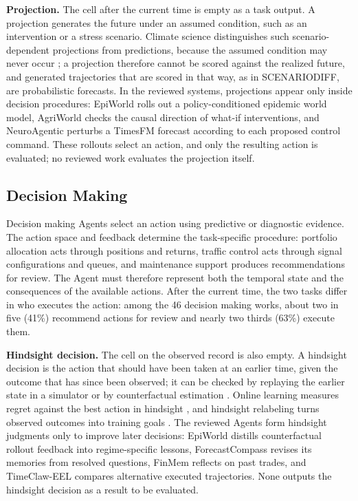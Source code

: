 \documentclass[preprints,article,submit,moreauthors]{Definitions/mdpi}
\begin{document}
\noindent\textbf{Projection.} The cell after the current time is empty as a task output. A projection generates the future under an assumed condition, such as an intervention or a stress scenario. Climate science distinguishes such scenario-dependent projections from predictions, because the assumed condition may never occur \citep{ipcc2021glossary}; a projection therefore cannot be scored against the realized future, and generated trajectories that are scored in that way, as in SCENARIODIFF, are probabilistic forecasts. In the reviewed systems, projections appear only inside decision procedures: EpiWorld \citep{epiworld2026} rolls out a policy-conditioned epidemic world model, AgriWorld \citep{agriworld2026} checks the causal direction of what-if interventions, and NeuroAgentic \citep{neuroagentic2026} perturbs a TimesFM forecast according to each proposed control command. These rollouts select an action, and only the resulting action is evaluated; no reviewed work evaluates the projection itself.

\subsection{Decision Making}
\label{sec:task-decision}

Decision making Agents select an action using predictive or diagnostic evidence. The action space and feedback determine the task-specific procedure: portfolio allocation acts through positions and returns, traffic control acts through signal configurations and queues, and maintenance support produces recommendations for review. The Agent must therefore represent both the temporal state and the consequences of the available actions. After the current time, the two tasks differ in who executes the action: among the 46 decision making works, about two in five (41\%) recommend actions for review and nearly two thirds (63\%) execute them.

\noindent\textbf{Hindsight decision.} The cell on the observed record is also empty. A hindsight decision is the action that should have been taken at an earlier time, given the outcome that has since been observed; it can be checked by replaying the earlier state in a simulator or by counterfactual estimation \citep{pearl2009causality}. Online learning measures regret against the best action in hindsight \citep{cesabianchi2006prediction}, and hindsight relabeling turns observed outcomes into training goals \citep{andrychowicz2017her}. The reviewed Agents form hindsight judgments only to improve later decisions: EpiWorld distills counterfactual rollout feedback into regime-specific lessons, ForecastCompass \citep{forecastcompass2026} revises its memories from resolved questions, FinMem \citep{finmem2023} reflects on past trades, and TimeClaw-EEL \citep{timeclaw2026explore} compares alternative executed trajectories. None outputs the hindsight decision as a result to be evaluated.
\end{document}
